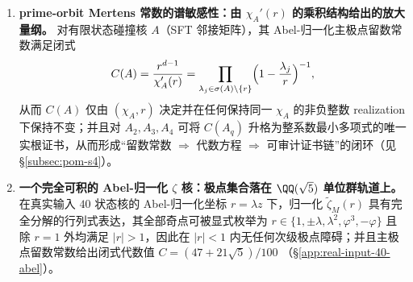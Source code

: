\begin{enumerate}
  \item \textbf{prime-orbit Mertens 常数的谱敏感性：由 \texorpdfstring{$\chi_A'(r)$}{chi'(r)} 的乘积结构给出的放大量纲。}
  对有限状态碰撞核 \(A\)（SFT 邻接矩阵），其 Abel-归一化主极点留数常数满足闭式
  \[
  C(A)=\frac{r^{d-1}}{\chi_A'(r)}=\prod_{\lambda_j\in\sigma(A)\setminus\{r\}}\Bigl(1-\frac{\lambda_j}{r}\Bigr)^{-1},
  \]
  从而 \(C(A)\) 仅由 \((\chi_A,r)\) 决定并在任何保持同一 \(\chi_A\) 的非负整数 realization 下保持不变；并且对 \(A_2,A_3,A_4\) 可将 \(C(A_q)\) 升格为整系数最小多项式的唯一实根证书，从而形成“留数常数 \(\Rightarrow\) 代数方程 \(\Rightarrow\) 可审计证书链”的闭环（见 \S\ref{subsec:pom-s4}）。

  \item \textbf{一个完全可积的 Abel-归一化 \texorpdfstring{$\zeta$}{zeta} 核：极点集合落在 \texorpdfstring{$\QQ(\sqrt5)$}{Q(sqrt5)} 单位群轨道上。}
  在真实输入 \(40\) 状态核的 Abel-归一化坐标 \(r=\lambda z\) 下，归一化 \(\widetilde{\zeta}_M(r)\) 具有完全分解的行列式表达，其全部奇点可被显式枚举为
  \(
  r\in\{1,\pm\lambda,\lambda^2,\varphi^3,-\varphi\}
  \)
  且除 \(r=1\) 外均满足 \(|r|>1\)，因此在 \(|r|<1\) 内无任何次级极点障碍；并且主极点留数常数给出闭式代数值
  \(
  C=(47+21\sqrt5)/100
  \)
  （\S\ref{app:real-input-40-abel}）。
\end{enumerate}

